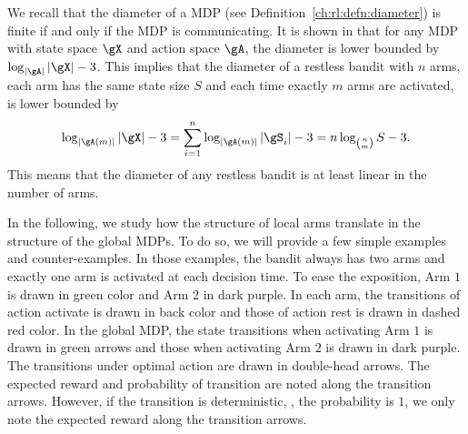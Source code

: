 We recall that the diameter of a MDP (see Definition~\ref{ch:rl:defn:diameter}) is finite if and only if the MDP is communicating.
It is shown in \cite[Appendix A]{jaksch2010near} that for any MDP with state space $\gX$ and action space $\gA$, the diameter is lower bounded by $\log_{|\gA|}|\gX|-3$.
This implies that the diameter of a restless bandit with $n$ arms, each arm has the same state size $S$ and each time exactly $m$ arms are activated, is lower bounded by
\begin{equation*}
    \log_{|\gA(m)|}|\gX| -3 = \sum_{i=1}^{n}\log_{|\gA(m)|}|\gS_i| -3 =n\log_{{n \choose m}}S -3.
\end{equation*}
This means that the diameter of any restless bandit is at least linear in the number of arms.

%
%

In the following, we study how the structure of local arms translate in the structure of the global MDPs.
To do so, we will provide a few simple examples and counter-examples.
In those examples, the bandit always has two arms and exactly one arm is activated at each decision time.
To ease the exposition, Arm $1$ is drawn in green color and Arm $2$ in dark purple.
In each arm, the transitions of action activate is drawn in back color and those of action rest is drawn in dashed red color.
In the global MDP, the state transitions when activating Arm $1$ is drawn in green arrows and those when activating Arm $2$ is drawn in dark purple.
The transitions under optimal action are drawn in double-head arrows.
The expected reward and probability of transition are noted along the transition arrows.
However, if the transition is deterministic, \ie, the probability is $1$, we only note the expected reward along the transition arrows.

